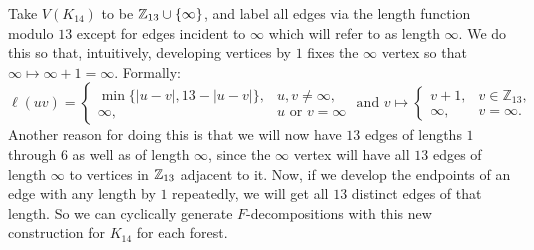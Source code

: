 Take $V(K_{14})$ to be $\mathbb{Z}_{13}\cup \{\infty\}$, and label all edges via the length function modulo $13$ except for edges incident to $\infty$ which will refer to as length $\infty$. We do this so that, intuitively, developing vertices by $1$ fixes the $\infty$ vertex so that $\infty\mapsto \infty+1=\infty$. Formally:
$$\ell(uv)=\begin{cases}\min\{|u-v|,13-|u-v|\}, & u,v\neq \infty, \\ \infty, & u\text{ or }v=\infty \end{cases} \text{ and }v\mapsto 
\begin{cases}
  v+1,&v\in\mathbb{Z}_{13},\\
  \infty,        &v=\infty.
  \end{cases}$$
Another reason for doing this is that we will now have $13$ edges of lengths $1$ through $6$ as well as of length $\infty$, since the $\infty$ vertex will have all $13$ edges of length $\infty$ to vertices in $\mathbb{Z}_{13}$ adjacent to it. Now, if we develop the endpoints of an edge with any length by $1$ repeatedly, we will get all $13$ distinct edges of that length. So we can cyclically generate $F$-decompositions with this new construction for $K_{14}$ for each forest.


